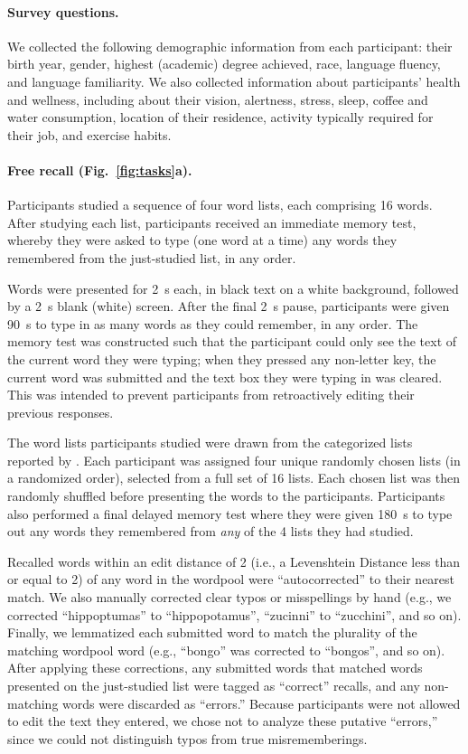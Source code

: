 \documentclass[10pt]{article}
\begin{document}
\paragraph*{Survey questions.}  We collected the following demographic
information from each participant: their birth year, gender, highest
(academic) degree achieved, race, language fluency, and language
familiarity.  We also collected information about participants'
health and wellness, including about their vision, alertness, stress, sleep, coffee
and water consumption, location of their residence, activity typically
required for their job, and exercise habits.


\paragraph*{Free recall (Fig.~\ref{fig:tasks}a).} 
Participants studied a sequence of four word lists, each comprising 16
words.  After studying each list, participants received an immediate
memory test, whereby they were asked to type (one word at a time) any
words they remembered from the just-studied list, in any order.

Words were presented for 2~s each, in black text on a white
background, followed by a 2~s blank (white) screen.  After the final
2~s pause, participants were given 90~s to type in as many words as
they could remember, in any order.  The memory test was constructed
such that the participant could only see the text of the current word
they were typing; when they pressed any non-letter key, the current
word was submitted and the text box they were typing in was cleared.
This was intended to prevent participants from retroactively editing
their previous responses.

The word lists participants studied were drawn from the categorized
lists reported by \cite{ZimaEtal18}.  Each participant was assigned
four unique randomly chosen lists (in a randomized order), selected
from a full set of 16 lists.  Each chosen list was then randomly
shuffled before presenting the words to the participants.
Participants also performed a final delayed memory test where they
were given 180~s to type out any words they remembered from
\textit{any} of the 4 lists they had studied.

Recalled words within an edit distance of 2 (i.e., a Levenshtein Distance less
than or equal to 2) of any word in the wordpool were ``autocorrected''
to their nearest match.  We also manually corrected clear typos or
misspellings by hand (e.g., we corrected ``hippoptumas'' to
``hippopotamus'', ``zucinni'' to ``zucchini'', and so on).  Finally,
we lemmatized each submitted word to match the plurality of the
matching wordpool word (e.g., ``bongo'' was corrected to ``bongos'',
and so on).  After applying these corrections, any submitted words
that matched words presented on the just-studied list were tagged as
``correct'' recalls, and any non-matching words were discarded as
``errors.''  Because participants were not allowed to edit the text
they entered, we chose not to analyze these putative ``errors,'' since
we could not distinguish typos from true misrememberings.
\end{document}
